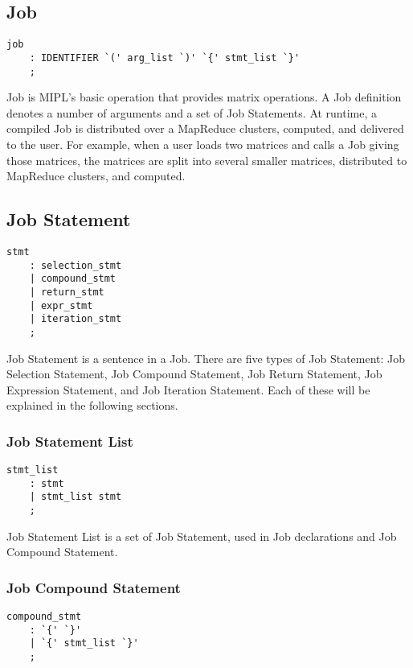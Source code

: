 \documentclass[prodmode,acmtecs]{acmsmall}
\begin{document}
\subsection{Job}

\begin{lstlisting}
job
	: IDENTIFIER `(' arg_list `)' `{' stmt_list `}'
	;
\end{lstlisting}

Job is MIPL's basic operation that provides matrix operations.
A Job definition denotes a number of arguments and a set of Job
Statements.  At runtime, a compiled Job is distributed over
a MapReduce clusters, computed, and delivered to the user. For
example, when a user loads two matrices and calls a Job giving those
matrices, the matrices are split into several smaller matrices,
distributed to MapReduce clusters, and computed.


\subsection{Job Statement}

\begin{lstlisting}
stmt
	: selection_stmt
	| compound_stmt
	| return_stmt
	| expr_stmt
	| iteration_stmt
	;
\end{lstlisting}

Job Statement is a sentence in a Job.  There are five types of
Job Statement: Job Selection Statement, Job Compound Statement,
Job Return Statement, Job Expression Statement, and Job Iteration
Statement.  Each of these will be explained in the following
sections.

\subsubsection{Job Statement List}

\begin{lstlisting}
stmt_list
	: stmt
	| stmt_list stmt
	;
\end{lstlisting}

Job Statement List is a set of Job Statement, used in Job
declarations and Job Compound Statement.


\subsubsection{Job Compound Statement}

\begin{lstlisting}
compound_stmt
	: `{' `}'
	| `{' stmt_list `}'
	;
\end{lstlisting}
\end{document}
